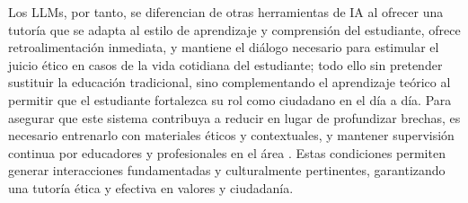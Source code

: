Los LLMs, por tanto, se diferencian de otras herramientas de IA al ofrecer una tutoría que se adapta al estilo de aprendizaje y comprensión del estudiante, ofrece retroalimentación inmediata, y mantiene el diálogo necesario para estimular el juicio ético en casos de la vida cotidiana del estudiante; todo ello sin pretender sustituir la educación tradicional, sino complementando el aprendizaje teórico al permitir que el estudiante fortalezca su rol como ciudadano en el día a día. Para asegurar que este sistema contribuya a reducir en lugar de profundizar brechas, es necesario entrenarlo con materiales éticos y contextuales, y mantener supervisión continua por educadores y profesionales en el área \cite{unesco2021ethics,unesco2021guidance}. Estas condiciones permiten generar interacciones fundamentadas y culturalmente pertinentes, garantizando una tutoría ética y efectiva en valores y ciudadanía.